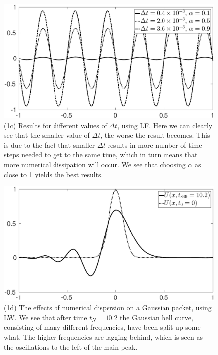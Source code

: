 \documentclass[11pt,letter, swedish, english
]{article}
\newcommand{\Dt}{\ensuremath{\Delta{t}}}
\begin{document}
\begin{figure}
\centering
\includegraphics[width=1\textwidth]{1c.eps}
\caption{(1c) Results for different values of $\Dt$, using LF. Here we
can clearly see that the smaller value of $\Dt$, the worse the result
becomes. This is due to the fact that smaller $\Dt$ results in more
number of time steps needed to get to the same time, which in turn
means that more numerical dissipation will occur. We see that choosing
$\alpha$ as close to 1 yields the best results. }
\label{fig:1c}
\end{figure}


\begin{figure}
\centering
\includegraphics[width=1\textwidth]{1d.eps}
\caption{(1d) The effects of numerical dispersion on a Gaussian
  packet, using LW. We see that after time $t_N=10.2$ the Gaussian bell
  curve, consisting of many different frequencies, have been split up
  some what. The higher frequencies are lagging behind, which is seen
  as the oscillations to the left of the main peak. }
\label{fig:1d}
\end{figure}
\end{document}
